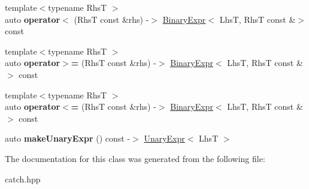 \begin{DoxyCompactItemize}
\item 
\mbox{\label{class_catch_1_1_expr_lhs_a55284221df2edb3542e765c87b5691b9}} 
{\footnotesize template$<$typename RhsT $>$ }\\auto {\bfseries operator$<$} (RhsT const \&rhs) -\/$>$ \mbox{\hyperlink{class_catch_1_1_binary_expr}{Binary\+Expr}}$<$ LhsT, RhsT const \&$>$ const
\item 
\mbox{\label{class_catch_1_1_expr_lhs_aff594ae5b957105c517a6257d2e730f0}} 
{\footnotesize template$<$typename RhsT $>$ }\\auto {\bfseries operator$>$=} (RhsT const \&rhs) -\/$>$ \mbox{\hyperlink{class_catch_1_1_binary_expr}{Binary\+Expr}}$<$ LhsT, RhsT const \&$>$ const
\item 
\mbox{\label{class_catch_1_1_expr_lhs_a6bd8a22c1a7fe2f66d71d7196f20af4f}} 
{\footnotesize template$<$typename RhsT $>$ }\\auto {\bfseries operator$<$=} (RhsT const \&rhs) -\/$>$ \mbox{\hyperlink{class_catch_1_1_binary_expr}{Binary\+Expr}}$<$ LhsT, RhsT const \&$>$ const
\item 
\mbox{\label{class_catch_1_1_expr_lhs_ab68bd6d5d3ae21b7fba9010150fba95d}} 
auto {\bfseries make\+Unary\+Expr} () const -\/$>$ \mbox{\hyperlink{class_catch_1_1_unary_expr}{Unary\+Expr}}$<$ LhsT $>$
\end{DoxyCompactItemize}


The documentation for this class was generated from the following file\+:\begin{DoxyCompactItemize}
\item 
catch.\+hpp\end{DoxyCompactItemize}
